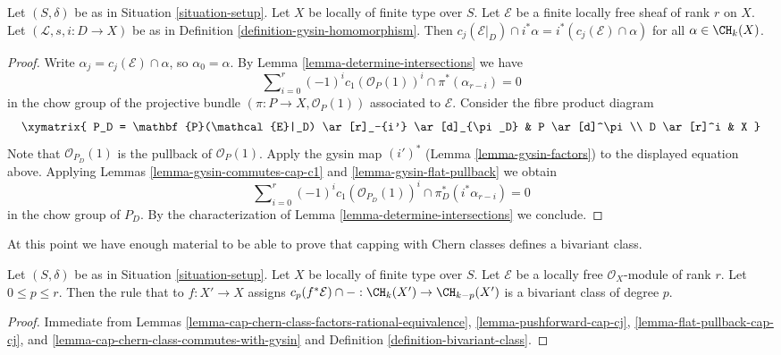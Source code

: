 \begin{lemma}
\label{lemma-cap-chern-class-commutes-with-gysin}
Let $(S, \delta)$ be as in Situation \ref{situation-setup}.
Let $X$ be locally of finite type over $S$.
Let $\mathcal{E}$ be a finite locally free sheaf of rank $r$ on $X$.
Let $(\mathcal{L}, s, i : D \to X)$ be as in
Definition \ref{definition-gysin-homomorphism}.
Then $c_j(\mathcal{E}|_D) \cap i^*\alpha = i^*(c_j(\mathcal{E}) \cap \alpha)$
for all $\alpha \in \CH_k(X)$.
\end{lemma}

\begin{proof}
Write $\alpha_j = c_j(\mathcal{E}) \cap \alpha$, so $\alpha_0 = \alpha$.
By Lemma \ref{lemma-determine-intersections} we have
$$
\sum\nolimits_{i = 0}^r
(-1)^i c_1(\mathcal{O}_P(1))^i \cap
\pi^*(\alpha_{r - i}) = 0
$$
in the chow group of the projective bundle
$(\pi : P \to X, \mathcal{O}_P(1))$
associated to $\mathcal{E}$. Consider the fibre product diagram
$$
\xymatrix{
P_D = \mathbf{P}(\mathcal{E}|_D) \ar[r]_-{i'} \ar[d]_{\pi_D} &
P \ar[d]^\pi \\
D \ar[r]^i & X
}
$$
Note that $\mathcal{O}_{P_D}(1)$ is the pullback of $\mathcal{O}_P(1)$.
Apply the gysin map $(i')^*$ (Lemma \ref{lemma-gysin-factors}) to the
displayed equation above.
Applying Lemmas \ref{lemma-gysin-commutes-cap-c1} and
\ref{lemma-gysin-flat-pullback} we obtain
$$
\sum\nolimits_{i = 0}^r
(-1)^i c_1(\mathcal{O}_{P_D}(1))^i \cap
\pi_D^*(i^*\alpha_{r - i}) = 0
$$
in the chow group of $P_D$.
By the characterization of Lemma \ref{lemma-determine-intersections}
we conclude.
\end{proof}

\noindent
At this point we have enough material to be able to prove that
capping with Chern classes defines a bivariant class.

\begin{lemma}
\label{lemma-cap-cp-bivariant}
Let $(S, \delta)$ be as in Situation \ref{situation-setup}.
Let $X$ be locally of finite type over $S$.
Let $\mathcal{E}$ be a locally free $\mathcal{O}_X$-module
of rank $r$. Let $0 \leq p \leq r$.
Then the rule that to $f : X' \to X$ assigns
$c_p(f^*\mathcal{E}) \cap - : \CH_k(X') \to \CH_{k - p}(X')$
is a bivariant class of degree $p$.
\end{lemma}

\begin{proof}
Immediate from Lemmas
\ref{lemma-cap-chern-class-factors-rational-equivalence},
\ref{lemma-pushforward-cap-cj},
\ref{lemma-flat-pullback-cap-cj}, and
\ref{lemma-cap-chern-class-commutes-with-gysin}
and Definition \ref{definition-bivariant-class}.
\end{proof}

